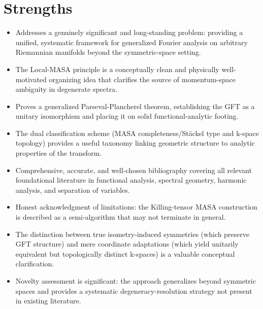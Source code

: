 \documentclass[11pt]{article}
\begin{document}
\section*{Strengths}
\begin{itemize}[leftmargin=*]
  \item Addresses a genuinely significant and long-standing problem: providing a unified, systematic framework for generalized Fourier analysis on arbitrary Riemannian manifolds beyond the symmetric-space setting.
  \item The Local-MASA principle is a conceptually clean and physically well-motivated organizing idea that clarifies the source of momentum-space ambiguity in degenerate spectra.
  \item Proves a generalized Parseval-Plancherel theorem, establishing the GFT as a unitary isomorphism and placing it on solid functional-analytic footing.
  \item The dual classification scheme (MASA completeness/Stäckel type and k-space topology) provides a useful taxonomy linking geometric structure to analytic properties of the transform.
  \item Comprehensive, accurate, and well-chosen bibliography covering all relevant foundational literature in functional analysis, spectral geometry, harmonic analysis, and separation of variables.
  \item Honest acknowledgment of limitations: the Killing-tensor MASA construction is described as a semi-algorithm that may not terminate in general.
  \item The distinction between true isometry-induced symmetries (which preserve GFT structure) and mere coordinate adaptations (which yield unitarily equivalent but topologically distinct k-spaces) is a valuable conceptual clarification.
  \item Novelty assessment is significant: the approach generalizes beyond symmetric spaces and provides a systematic degeneracy-resolution strategy not present in existing literature.
\end{itemize}
\end{document}

